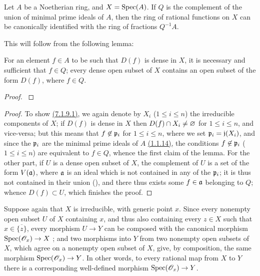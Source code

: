 \begin{cor}[7.1.9]
\label{1.7.1.9}
Let $A$ be a Noetherian ring, and $X={\mathop{\mathrm{Spec}}\nolimits}(A)$.
If $Q$ is the complement of the union of minimal prime ideals of $A$, then the ring of rational functions on $X$ can be canonically identified with the ring of fractions $Q^{-1}A$.
\end{cor}

This will follow from the following lemma:

\begin{lem}[7.1.9.1]
\label{1.7.1.9.1}
For an element $f\in A$ to be such that $D(f)$ is dense in $X$, it is necessary and sufficient that $f\in Q$; every dense open subset of $X$ contains an open subset of the form $D(f)$, where $f\in Q$.
\end{lem}

\begin{proof}
\label{proof-1.7.1.9}
\end{proof}

\begin{proof}
\label{proof-1.7.1.9.1}
To show \hyperref[1.7.1.9.1]{(7.1.9.1)}, we again denote by $X_i$ ($1\leqslant i\leqslant n$) the irreducible components of $X$; if $D(f)$ is dense in $X$ then $D(f)\cap X_i\neq\varnothing$ for $1\leqslant i\leqslant n$, and vice-versa; but this means that $f\not\in\mathfrak{p}_i$ for $1\leqslant i\leqslant n$, where we set $\mathfrak{p}_i=\mathfrak{j}(X_i)$, and since the $\mathfrak{p}_i$ are the minimal prime ideals of $A$ \hyperref[1.1.1.14]{(1.1.14)}, the conditions $f\not\in\mathfrak{p}_i$ ($1\leqslant i\leqslant n$) are equivalent to $f\in Q$, whence the first claim of the lemma.
For the other part, if $U$ is a dense open subset of $X$, the complement of $U$ is a set of the form $V(\mathfrak{a})$, where $\mathfrak{a}$ is an ideal which is not contained in any of the $\mathfrak{p}_i$; it is thus not contained in their union (\cite[p.~13]{I-10}), and there thus exists some $f\in\mathfrak{a}$ belonging to $Q$; whence $D(f)\subset U$, which finishes the proof.
\end{proof}

\begin{env}[7.1.10]
\label{1.7.1.10}
Suppose again that $X$ is irreducible, with generic point $x$.
Since every nonempty open subset $U$ of $X$ containing $x$, and thus also containing every $z\in X$ such that $x\in\overline{\{z\}}$, every morphism $U\to Y$ can be composed with the canonical morphism ${\mathop{\mathrm{Spec}}\nolimits}(\mathscr{O}_x)\to X$ ; and two morphisms into $Y$ from two nonempty open subsets of $X$, which agree on a nonempty open subset of $X$, give, by composition, the same morphism ${\mathop{\mathrm{Spec}}\nolimits}(\mathscr{O}_x)\to Y$.
In other words, to every rational map from $X$ to $Y$ there is a corresponding well-defined morphism ${\mathop{\mathrm{Spec}}\nolimits}(\mathscr{O}_x)\to Y$.
\end{env}

